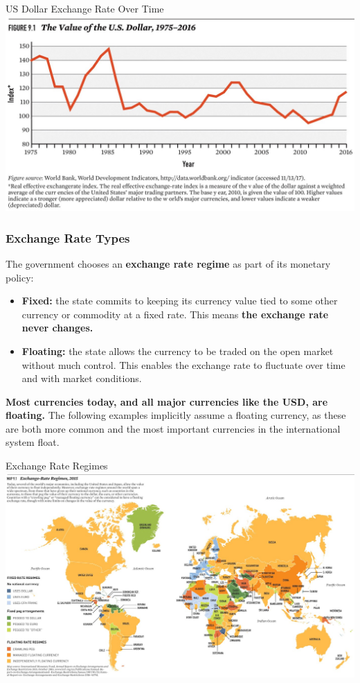 \documentclass{beamer}
\begin{document}
\begin{frame}{\LARGE US Dollar Exchange Rate Over Time}
	\centering
	\includegraphics[width=\textwidth,height=0.8\textheight,keepaspectratio]{USXR.jpg}
\end{frame}

\begin{frame} 
	\frametitle{\LARGE{Exchange Rate Types}}
	The government chooses an \textbf{exchange rate regime} as part of its monetary policy:  \pause
	\begin{itemize}
		\item \textbf{Fixed:} the state commits to keeping its currency value tied to some other currency or commodity at a fixed rate. This means \textbf{the exchange rate never changes.} \pause 
		\item \textbf{Floating:} the state allows the currency to be traded on the open market without much control. This enables the exchange rate to fluctuate over time and with market conditions. \pause
	\end{itemize}
	\textbf{Most currencies today, and all major currencies like the USD, are floating.} The following examples implicitly assume a floating currency, as these are both more common and the most important currencies in the international system float.
\end{frame}

\begin{frame}{\LARGE Exchange Rate Regimes}
	\centering
	\includegraphics[width=\textwidth,height=0.8\textheight,keepaspectratio]{exchange rate regimes.jpg}
\end{frame}
\end{document}
